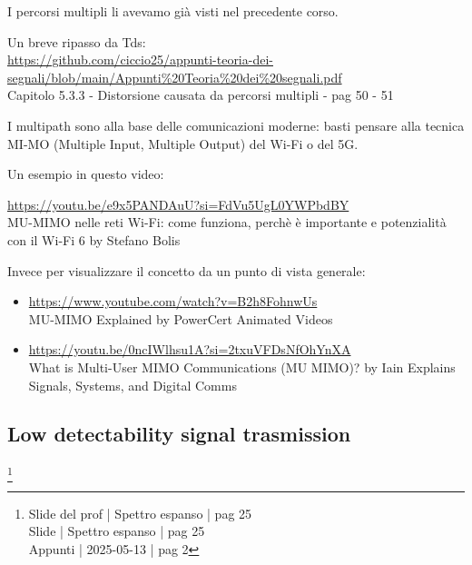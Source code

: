 \begin{tcolorbox}
    I percorsi multipli li avevamo già visti nel precedente corso. \newline 

    Un breve ripasso da Tds: \\
    \url{https://github.com/ciccio25/appunti-teoria-dei-segnali/blob/main/Appunti%20Teoria%20dei%20segnali.pdf} \\
    Capitolo 5.3.3 - Distorsione causata da percorsi multipli - pag 50 - 51 \newline 

    I multipath sono alla base delle comunicazioni moderne: basti pensare alla tecnica MI-MO (Multiple Input, Multiple Output) 
    del Wi-Fi o del 5G. \newline 

    Un esempio in questo video: \newline 

    \url{https://youtu.be/e9x5PANDAuU?si=FdVu5UgL0YWPbdBY} \\
    MU-MIMO nelle reti Wi-Fi: come funziona, perchè è importante e potenzialità con il Wi-Fi 6 by Stefano Bolis \newline 

    Invece per visualizzare il concetto da un punto di vista generale: \newline 

    \begin{itemize}
        \item \url{https://www.youtube.com/watch?v=B2h8FohnwUs} \\ MU-MIMO Explained by PowerCert Animated Videos 
        \item \url{https://youtu.be/0ncIWlhsu1A?si=2txuVFDsNfOhYnXA} \\ What is Multi-User MIMO Communications (MU MIMO)? by Iain Explains Signals, Systems, and Digital Comms
    \end{itemize}

\end{tcolorbox}


\newpage 

\subsection{Low detectability signal trasmission}
\footnote{Slide del prof | Spettro espanso | pag 25 \\
Slide | Spettro espanso | pag 25 \\
Appunti | 2025-05-13 | pag 2 
} 


